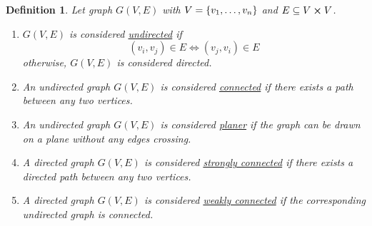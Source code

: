 \documentclass[]{article}
\numberwithin{equation}{section}
\newtheorem{definition}{Definition}
\begin{document}
\begin{definition} \label{def:graph_properties}
	Let graph $G(V,E)$ with $V = \qty{v_1,\dots,v_n}$ and $E \subseteq V \cross V$.
	\begin{enumerate}
		\item $G(V,E)$ is considered \underline{\emph{undirected}} if\[
			(v_i,v_j) \in E \iff (v_j,v_i) \in E
		\] otherwise, $G(V,E)$ is considered \emph{directed}.
		\item An undirected graph $G(V,E)$ is considered \underline{\emph{connected}} if there exists a path between any two vertices.
		\item An undirected graph $G(V,E)$ is considered \underline{\emph{planer}} if the graph can be drawn on a plane without any edges crossing.
		\item A directed graph $G(V,E)$ is considered \underline{\emph{strongly connected}} if there exists a directed path between any two vertices.
		\item A directed graph $G(V,E)$ is considered \underline{\emph{weakly connected}} if the corresponding undirected graph is connected.
	\end{enumerate}
\end{definition}
\end{document}
